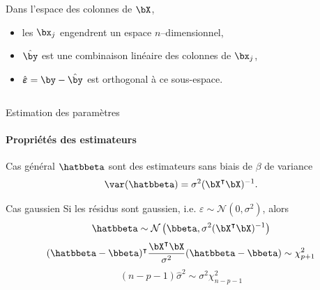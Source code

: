 \documentclass{beamer}\usepackage[]{graphicx}\usepackage[]{color}
\begin{document}
\begin{frame}
\begin{columns}[c]
    \begin{column}{.5\textwidth}
      \begin{block}{Dans l'espace des colonnes de $\bX$,}
        \begin{itemize}
        \item les $\bx_j$ engendrent un espace $n$--dimensionnel,
        \item $\hat{\by}$ est une combinaison linéaire des colonnes de
          $\bx_j$,
        \item   $\hat{\boldsymbol\varepsilon}  =   \by-\hat{\by}$  est
          orthogonal à ce sous-espace.
        \end{itemize}
      \end{block}
    \end{column}
  \end{columns}
\end{frame}

\begin{frame}{Estimation des paramètres}
   \framesubtitle{Propriétés des estimateurs}
  
   \begin{block}{Cas général}
     $\hatbbeta$ sont des estimateurs sans biais de $\beta$ de variance
     \begin{equation*}
       \var(\hatbbeta) = \sigma^2 (\bX^\intercal\bX)^{-1}.
     \end{equation*}
   \end{block}
  
   \begin{block}{Cas gaussien}
     Si les résidus sont gaussien, i.e. $\varepsilon\sim\mathcal{N}(0,\sigma^2)$, alors 
     \begin{equation*}
       \hatbbeta \sim\mathcal{N}\left(\bbeta,\sigma^2 (\bX^\intercal\bX)^{-1}\right)
     \end{equation*}
     \begin{equation*}
(\hatbbeta-\bbeta)^\intercal\frac{\bX^\intercal \bX}{\sigma^2} (\hatbbeta-\bbeta)
\sim\chi^2_{p+1}
     \end{equation*}
     \begin{equation*}
       (n-p-1) \hat\sigma^2 \sim \sigma^2\chi^2_{n-p-1}
\end{equation*}
\end{block}
 
 \end{frame}
\end{document}
